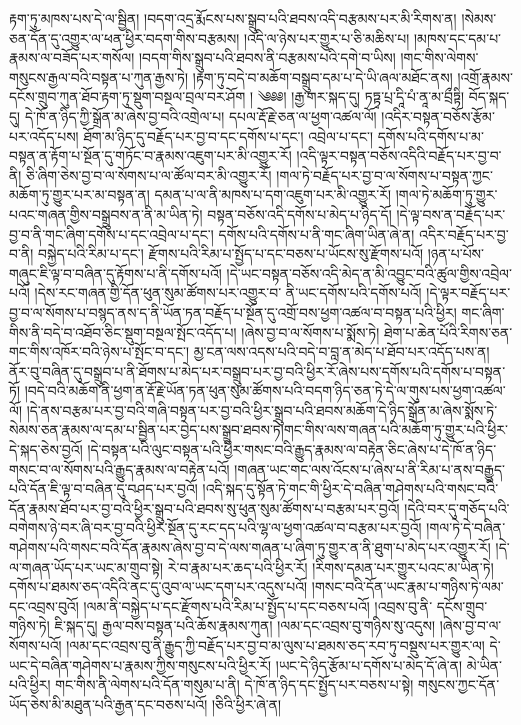 རྟག་ཏུ་མཁས་པས་དེ་ལ་སྦྱིན། །བདག་འདྲ་རྨོངས་པས་སྒྲུབ་པའི་ཐབས་འདི་བརྩམས་པར་མི་རིགས་ན། །སེམས་ཅན་དོན་དུ་འགྱུར་ལ་ཕན་ཕྱིར་བདག་གིས་བརྩམས། །འདི་ལ་ཉེས་པར་གྱུར་པ་ཅི་མཆིས་པ། །མཁས་དང་དམ་པ་རྣམས་ལ་བཟོད་པར་གསོལ། །བདག་གིས་སྒྲུབ་པའི་ཐབས་ནི་བརྩམས་པའི་དགེ་བ་ཡིས། །གང་གིས་ལེགས་གསུངས་རྒྱལ་བའི་བསྟན་པ་ཀུན་རྒྱས་ཏེ། །རྟག་ཏུ་བདེ་བ་མཆོག་བསྒྲུབ་དམ་པ་དེ་ཡི་ཞལ་མཐོང་ནས། །འགྲོ་རྣམས་དངོས་གྲུབ་ཀུན་ཐོབ་རྟག་ཏུ་སྡུག་བསྔལ་བྲལ་བར་ཤོག ། ༄༅༅། །རྒྱ་གར་སྐད་དུ། ཏཏྟྭ་པྲ་དཱི་པཾ་ནཱ་མ་བྲྀཏྟི། བོད་སྐད་དུ། དེ་ཁོ་ན་ཉིད་ཀྱི་སྒྲོན་མ་ཞེས་བྱ་བའི་འགྲེལ་པ། དཔལ་རྡོ་རྗེ་ཅན་ལ་ཕྱག་འཚལ་ལོ། །འདིར་བསྟན་བཅོས་རྩོམ་པར་འདོད་པས། ཐོག་མ་ཉིད་དུ་བརྗོད་པར་བྱ་བ་དང་དགོས་པ་དང་། འབྲེལ་པ་དང་། དགོས་པའི་དགོས་པ་མ་བསྟན་ན་རྟོག་པ་སྔོན་དུ་གཏོང་བ་རྣམས་འཇུག་པར་མི་འགྱུར་རོ། །འདི་ལྟར་བསྟན་བཅོས་འདིའི་བརྗོད་པར་བྱ་བ་ནི། ཅི་ཞིག་ཅེས་བྱ་བ་ལ་སོགས་པ་ལ་ཚོལ་བར་མི་འགྱུར་རོ། །གལ་ཏེ་བརྗོད་པར་བྱ་བ་ལ་སོགས་པ་བསྟན་ཀྱང་མཆོག་ཏུ་གྱུར་པར་མ་བསྟན་ན། དམན་པ་ལ་ནི་མཁས་པ་དག་འཇུག་པར་མི་འགྱུར་རོ། །གལ་ཏེ་མཆོག་ཏུ་གྱུར་པའང་གཞན་གྱིས་བསྒྲུབས་ན་ནི་མ་ཡིན་ཏེ། བསྟན་བཅོས་འདི་དགོས་པ་མེད་པ་ཉིད་དོ། །དེ་ལྟ་བས་ན་བརྗོད་པར་བྱ་བ་ནི་གང་ཞིག་དགོས་པ་དང་འབྲེལ་པ་དང་། དགོས་པའི་དགོས་པ་ནི་གང་ཞིག་ཡིན་ཞེ་ན། འདིར་བརྗོད་པར་བྱ་བ་ནི། བསྐྱེད་པའི་རིམ་པ་དང་། རྫོགས་པའི་རིམ་པ་སྤྱོད་པ་དང་བཅས་པ་ཡོངས་སུ་རྫོགས་པའོ། །ཉན་པ་པོས་གཞུང་ཇི་ལྟ་བ་བཞིན་དུ་རྟོགས་པ་ནི་དགོས་པའོ། །དེ་ཡང་བསྟན་བཅོས་འདི་མེད་ན་མི་འབྱུང་བའི་ཚུལ་གྱིས་འབྲེལ་པའོ། །དེས་རང་གཞན་གྱི་དོན་ཕུན་སུམ་ཚོགས་པར་འགྱུར་བ་​ ནི་ཡང་དགོས་པའི་དགོས་པའོ། །དེ་ལྟར་བརྗོད་པར་བྱ་བ་ལ་སོགས་པ་བསྙད་ནས་ད་ནི་ཡོན་ཏན་བརྗོད་པ་སྔོན་དུ་འགྲོ་བས་ཕྱག་འཚལ་བ་བསྟན་པའི་ཕྱིར། གང་ཞིག་གིས་ནི་བདེ་བ་འཐོབ་ཅིང་སྡུག་བསྔལ་སྤོང་འདོད་པ། །ཞེས་བྱ་བ་ལ་སོགས་པ་སྨོས་ཏེ། ཐེག་པ་ཆེན་པོའི་རིགས་ཅན་གང་གིས་འཁོར་བའི་ཉེས་པ་སྤོང་བ་དང་། མྱ་ངན་ལས་འདས་པའི་བདེ་བ་བླ་ན་མེད་པ་ཐོབ་པར་འདོད་པས་ན། ནོར་བུ་བཞིན་དུ་བསྒྲུབ་པ་ནི་ཐོགས་པ་མེད་པར་བསྒྲུབ་པར་བྱ་བའི་ཕྱིར་རོ་ཞེས་པས་དགོས་པའི་དགོས་པ་བསྟན་ཏོ། །བདེ་བའི་མཆོག་ནི་ཕྱག་ན་རྡོ་རྗེ་ཡོན་ཏན་ཕུན་སུམ་ཚོགས་པའི་བདག་ཉིད་ཅན་ཏེ་དེ་ལ་གུས་པས་ཕྱག་འཚལ་ལོ། །དེ་ནས་བརྩམ་པར་བྱ་བའི་གཞི་བསྟན་པར་བྱ་བའི་ཕྱིར་སྒྲུབ་པའི་ཐབས་མཆོག་དེ་ཉིད་སྒྲོན་མ་ཞེས་སྨོས་ཏེ་སེམས་ཅན་རྣམས་ལ་དམ་པ་སྦྱིན་པར་བྱེད་པས་སྒྲུབ་ཐབས་ཏེ།གང་གིས་ལས་གཞན་པའི་མཆོག་ཏུ་གྱུར་པའི་ཕྱིར་དེ་སྐད་ཅེས་བྱའོ། །དེ་བསྟན་པའི་ལུང་བསྟན་པའི་ཕྱིར་གསང་བའི་རྒྱུད་རྣམས་ལ་བརྟེན་ཅིང་ཞེས་པ་དེ་ཁོ་ན་ཉིད་གསང་བ་ལ་སོགས་པའི་རྒྱུད་རྣམས་ལ་བརྟེན་པའོ། །གཞན་ཡང་གང་ལས་འོངས་པ་ཞེས་པ་ནི་རིམ་པ་ནས་བརྒྱུད་པའི་དོན་ཇི་ལྟ་བ་བཞིན་དུ་བཤད་པར་བྱའོ། །འདི་སྐད་དུ་སྟོན་ཏེ་གང་གི་ཕྱིར་དེ་བཞིན་གཤེགས་པའི་གསང་བའི་དོན་རྣམས་ཐོབ་པར་བྱ་བའི་ཕྱིར་སྒྲུབ་པའི་ཐབས་སུ་ཕུན་སུམ་ཚོགས་པ་བརྩམ་པར་བྱའོ། །དེའི་བར་དུ་གཅོད་པའི་བགེགས་ཉེ་བར་ཞི་བར་བྱ་བའི་ཕྱིར་སྔོན་དུ་རང་དད་པའི་ལྷ་ལ་ཕྱག་འཚལ་བ་བརྩམ་པར་བྱའོ། །གལ་ཏེ་དེ་བཞིན་གཤེགས་པའི་གསང་བའི་དོན་རྣམས་ཞེས་བྱ་བ་དེ་ལས་གཞན་པ་ཞིག་ཏུ་གྱུར་ན་ནི་ཐུག་པ་མེད་པར་འགྱུར་རོ། །དེ་ལ་གཞན་ཡོད་པར་ཡང་མ་གྲུབ་སྟེ། རེ་བ་རྣམ་པར་ཆད་པའི་ཕྱིར་རོ། །རིགས་དམན་པར་གྱུར་པའང་མ་ཡིན་ཏེ། དགོས་པ་ཐམས་ཅད་འདིའི་ནང་དུ་འུབ་ལ་ཡང་དག་པར་འདུས་པའོ། །གསང་བའི་དོན་ཡང་རྣམ་པ་གཉིས་ཏེ་ལམ་དང་འབྲས་བུའོ། །ལམ་ནི་བསྐྱེད་པ་དང་རྫོགས་པའི་རིམ་པ་སྤྱོད་པ་དང་བཅས་པའོ། །འབྲས་བུ་ནི་​ དངོས་གྲུབ་གཉིས་ཏེ། ཇི་སྐད་དུ། རྒྱལ་བས་བསྟན་པའི་ཆོས་རྣམས་ཀུན། །ལམ་དང་འབྲས་བུ་གཉིས་སུ་འདུས། །ཞེས་བྱ་བ་ལ་སོགས་པའོ། །ལམ་དང་འབྲས་བུ་ནི་རྒྱུད་ཀྱི་བརྗོད་པར་བྱ་བ་མ་ལུས་པ་ཐམས་ཅད་རབ་ཏུ་བསྡུས་པར་གྱུར་ལ། དེ་ཡང་དེ་བཞིན་གཤེགས་པ་རྣམས་ཀྱིས་གསུངས་པའི་ཕྱིར་རོ། །ཡང་དེ་ཉིད་རྩོམ་པ་དགོས་པ་མེད་དོ་ཞེ་ན། མེ་ཡིན་པའི་ཕྱིར། གང་གིས་ནི་ལེགས་པའི་དོན་གསུམ་པ་ནི། དེ་ཁོ་ན་ཉིད་དང་སྤྱོད་པར་བཅས་པ་སྟེ། གསུངས་ཀྱང་དོན་ཡོད་ཅེས་མི་མཐུན་པའི་རྒྱན་དང་བཅས་པའོ། །ཅིའི་ཕྱིར་ཞེ་ན། 